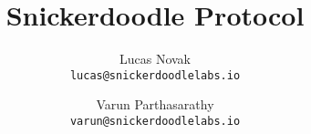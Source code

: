 \documentclass{article}
\title{Snickerdoodle Protocol}
\author{
  Lucas Novak\\
  \texttt{lucas@snickerdoodlelabs.io}
  \and
  Varun Parthasarathy\\
  \texttt{varun@snickerdoodlelabs.io}
}
\begin{document}
\maketitle
\tableofcontents{}
\pagebreak















\end{document}
